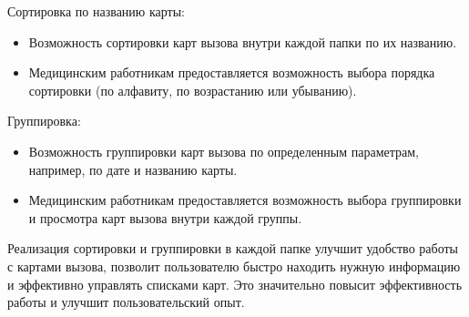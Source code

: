 Сортировка по названию карты:

\begin{itemize}
    \item Возможность сортировки карт вызова внутри каждой папки по их названию.
    \item Медицинским работникам предоставляется возможность выбора порядка сортировки (по алфавиту, по возрастанию или убыванию).
\end{itemize}

Группировка:

\begin{itemize}
    \item Возможность группировки карт вызова по определенным параметрам, например, по дате и названию карты.
    \item Медицинским работникам предоставляется возможность выбора группировки и просмотра карт вызова внутри каждой группы.
\end{itemize}

Реализация сортировки и группировки в каждой папке улучшит удобство работы с картами вызова, позволит пользователю быстро находить нужную информацию и эффективно управлять списками карт. Это значительно повысит эффективность работы и улучшит пользовательский опыт.
